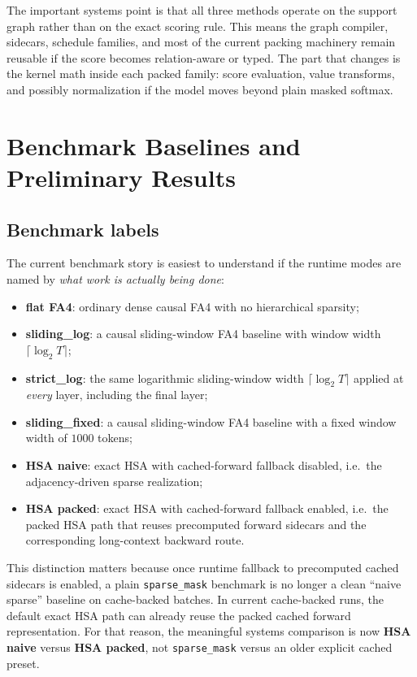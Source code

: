 \documentclass[11pt]{article}
\begin{document}
The important systems point is that all three methods operate on the support
graph rather than on the exact scoring rule. This means the graph compiler,
sidecars, schedule families, and most of the current packing machinery remain
reusable if the score becomes relation-aware or typed. The part that changes is
the kernel math inside each packed family: score evaluation, value transforms,
and possibly normalization if the model moves beyond plain masked softmax.

\section{Benchmark Baselines and Preliminary Results}

\subsection{Benchmark labels}

The current benchmark story is easiest to understand if the runtime modes are
named by \emph{what work is actually being done}:
\begin{itemize}[leftmargin=1.5em]
    \item \textbf{flat FA4}: ordinary dense causal FA4 with no hierarchical
    sparsity;
    \item \textbf{sliding\_log}: a causal sliding-window FA4 baseline with
    window width $\lceil \log_2 T \rceil$;
    \item \textbf{strict\_log}: the same logarithmic sliding-window width
    $\lceil \log_2 T \rceil$ applied at \emph{every} layer, including the final
    layer;
    \item \textbf{sliding\_fixed}: a causal sliding-window FA4 baseline with a
    fixed window width of $1000$ tokens;
    \item \textbf{HSA naive}: exact HSA with cached-forward fallback disabled,
    i.e.\ the adjacency-driven sparse realization;
    \item \textbf{HSA packed}: exact HSA with cached-forward fallback enabled,
    i.e.\ the packed HSA path that reuses precomputed forward sidecars and the
    corresponding long-context backward route.
\end{itemize}

This distinction matters because once runtime fallback to precomputed cached
sidecars is enabled, a plain \texttt{sparse\_mask} benchmark is no longer a
clean ``naive sparse'' baseline on cache-backed batches. In current cache-backed
runs, the default exact HSA path can already reuse the packed cached forward
representation. For that reason, the meaningful systems comparison is now
\textbf{HSA naive} versus \textbf{HSA packed}, not \texttt{sparse\_mask} versus
an older explicit cached preset.
\end{document}
